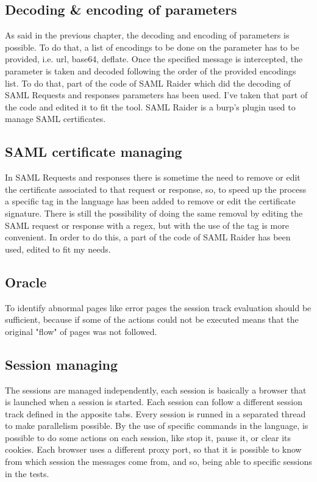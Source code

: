 \subsection{Decoding \& encoding of parameters}
As said in the previous chapter, the decoding and encoding of parameters is possible. To do that, a list of encodings to be done on the parameter has to be provided, i.e. url, base64, deflate. Once the specified message is intercepted, the parameter is taken and decoded following the order of the provided encodings list. To do that, part of the code of SAML Raider \cite{saml_raider} which did the decoding of \Gls{SAML} Requests and responses parameters has been used. I've taken that part of the code and edited it to fit the tool. SAML Raider is a \Gls{burp}'s plugin used to manage \Gls{SAML} certificates.

\subsection{SAML certificate managing}
In \Gls{SAML} Requests and responses there is sometime the need to remove or edit the certificate associated to that request or response, so, to speed up the process a specific tag in the language has been added to remove or edit the certificate signature. There is still the possibility of doing the same removal by editing the \Gls{SAML} request or response with a regex, but with the use of the tag is more convenient.
In order to do this, a part of the code of SAML Raider \cite{saml_raider} has been used, edited to fit my needs.

\subsection{Oracle}
To identify abnormal pages like error pages the \gls{session track} evaluation should be sufficient, because if some of the actions could not be executed means that the original "flow" of pages was not followed.

\subsection{Session managing}
The sessions are managed independently, each session is basically a browser that is launched when a session is started. Each session can follow a different \gls{session track} defined in the apposite tabs. Every session is runned in a separated thread to make parallelism possible. By the use of specific commands in the language, is possible to do some actions on each session, like stop it, pause it, or clear its cookies. Each browser uses a different proxy port, so that it is possible to know from which session the messages come from, and so, being able to specific sessions in the tests.





